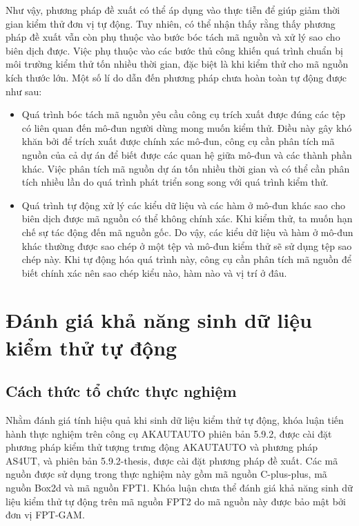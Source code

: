 Như vậy, phương pháp đề xuất có thể áp dụng vào thực tiễn để giúp giảm thời gian kiểm thử đơn vị tự động. Tuy nhiên, có thể nhận thấy rằng thấy phương pháp đề xuất vẫn còn phụ thuộc vào bước bóc tách mã nguồn và xử lý sao cho biên dịch được. Việc phụ thuộc vào các bước thủ công khiến quá trình chuẩn bị môi trường kiểm thử tốn nhiều thời gian, đặc biệt là khi kiểm thử cho mã nguồn kích thước lớn. Một số lí do dẫn đến phương pháp chưa hoàn toàn tự động được như sau:
\begin{itemize}
    \item Quá trình bóc tách mã nguồn yêu cầu công cụ trích xuất được đúng các tệp có liên quan đến mô-đun người dùng mong muốn kiểm thử. Điều này gây khó khăn bởi để trích xuất được chính xác mô-đun, công cụ cần phân tích mã nguồn của cả dự án để biết được các quan hệ giữa mô-đun và các thành phần khác. Việc phân tích mã nguồn dự án tốn nhiều thời gian và có thể cần phân tích nhiều lần do quá trình phát triển song song với quá trình kiểm thử.
    \item Quá trình tự động xử lý các kiểu dữ liệu và các hàm ở mô-đun khác sao cho biên dịch được mã nguồn có thể không chính xác. Khi kiểm thử, ta muốn hạn chế sự tác động đến mã nguồn gốc. Do vậy, các kiểu dữ liệu và hàm ở mô-đun khác thường được sao chép ở một tệp và mô-đun kiểm thử sẽ sử dụng tệp sao chép này. Khi tự động hóa quá trình này, công cụ cần phân tích mã nguồn để biết chính xác nên sao chép kiểu nào, hàm nào và vị trí ở đâu.
\end{itemize}
 
\section{Đánh giá khả năng sinh dữ liệu kiểm thử tự động}\label{sec:evaluate-autogen}
\subsection{Cách thức tổ chức thực nghiệm}
Nhằm đánh giá tính hiệu quả khi sinh dữ liệu kiểm thử tự động, khóa luận tiến hành thực nghiệm trên công cụ AKAUTAUTO phiên bản 5.9.2, được cài đặt phương pháp kiểm thử tượng trưng động AKAUTAUTO và phương pháp AS4UT, và phiên bản 5.9.2-thesis, được cài đặt phương pháp đề xuất. Các mã nguồn được sử dụng trong thực nghiệm này gồm mã nguồn C-plus-plus, mã nguồn Box2d và mã nguồn FPT1. Khóa luận chưa thể đánh giá khả năng sinh dữ liệu kiểm thử tự động trên mã nguồn FPT2 do mã nguồn này được bảo mật bởi đơn vị FPT-GAM.

